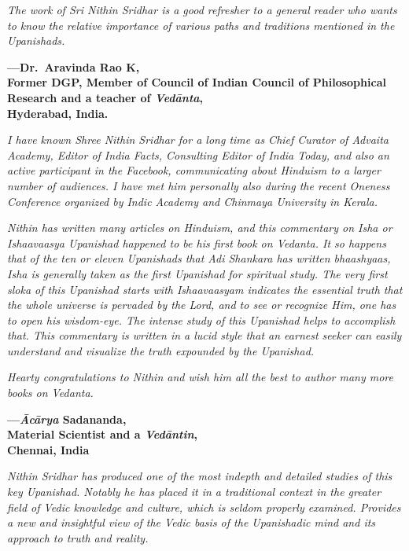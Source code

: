 \emph{The work of Sri Nithin Sridhar is a good refresher to a general reader who wants to know the relative importance of various paths and traditions mentioned in the Upanishads.}
\medskip

\begin{flushright}
\textbf{---Dr.\ Aravinda Rao K,}\\
\textbf{Former DGP, Member of Council of Indian Council of Philosophical Research and a teacher of \emph{Vedānta},}\\
\textbf{Hyderabad, India.}
\end{flushright}
\medskip

\emph{I have known Shree Nithin Sridhar for a long time as Chief Curator of Advaita Academy, Editor of India Facts, Consulting Editor of India Today, and also an active participant in the Facebook, communicating about Hinduism to a larger number of audiences. I have met him personally also during the recent Oneness Conference organized by Indic Academy and Chinmaya University in Kerala. }

\emph{Nithin has written many articles on Hinduism, and this commentary on Isha or Ishaavaasya Upanishad happened to be his first book on Vedanta. It so happens that of the ten or eleven Upanishads that Adi Shankara has written bhaashyaas, Isha is generally taken as the first Upanishad for spiritual study. The very first sloka of this Upanishad starts with Ishaavaasyam indicates the essential truth that the whole universe is pervaded by the Lord, and to see or recognize Him, one has to open his wisdom-eye. The intense study of this Upanishad helps to accomplish that. This commentary is written in a lucid style that an earnest seeker can easily understand and visualize the truth expounded by the Upanishad. }

\emph{Hearty congratulations to Nithin and wish him all the best to author many more books on Vedanta. }
\medskip

\begin{flushright}
\textbf{---\emph{Ācārya} Sadananda,}\\
\textbf{Material Scientist and a \emph{Vedāntin},}\\
\textbf{Chennai, India}
\end{flushright}
\medskip

\emph{Nithin Sridhar has produced one of the most indepth and detailed studies of this key Upanishad. Notably he has placed it in a traditional context in the greater field of Vedic knowledge and culture, which is seldom properly examined. Provides a new and insightful view of the Vedic basis of the Upanishadic mind and its approach to truth and reality.}
\medskip

